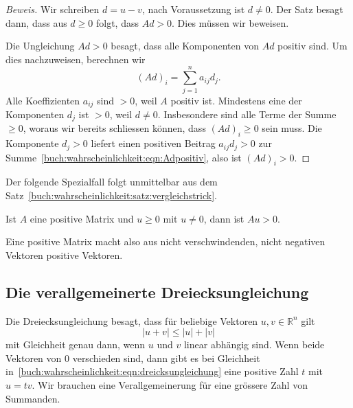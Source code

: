 \begin{proof}[Beweis]
Wir schreiben $d=u-v$, nach Voraussetzung ist $d\ne 0$.
Der Satz besagt dann, dass aus $d\ge 0$ folgt, dass $Ad>0$.
Dies müssen wir beweisen.

Die Ungleichung $Ad>0$ besagt, dass alle Komponenten von $Ad$ 
positiv sind.
Um dies nachzuweisen, berechnen wir
\begin{equation}
(Ad)_i
=
\sum_{j=1}^n
a_{i\!j}
d_j.
\label{buch:wahrscheinlichkeit:eqn:Adpositiv}
\end{equation}
Alle Koeffizienten  $a_{i\!j}$ sind $>0$, weil $A$ positiv ist.
Mindestens eine der Komponenten $d_j$ ist $>0$, weil $d\ne 0$.
Insbesondere sind alle Terme der Summe $\ge 0$, woraus wir
bereits schliessen können, dass $(Ad)_i\ge 0$ sein muss.
Die Komponente $d_j>0$ liefert einen positiven Beitrag
$a_{i\!j}d_j>0$
zur Summe~\eqref{buch:wahrscheinlichkeit:eqn:Adpositiv},
also ist $(Ad)_i>0$.
\end{proof}

Der folgende Spezialfall folgt unmittelbar aus dem
Satz~\ref{buch:wahrscheinlichkeit:satz:vergleichstrick}.

\begin{korollar}
\label{buch:wahrscheinlichkeit:satz:Au>0korollar}
Ist $A$ eine positive Matrix und $u\ge 0$ mit $u\ne 0$, dann
ist $Au>0$.
\end{korollar}

Eine positive Matrix macht also aus nicht verschwindenden,
nicht negativen Vektoren positive Vektoren.

%
%
\subsection{Die verallgemeinerte Dreiecksungleichung
\label{buch:subsection:verallgemeinerte-dreiecksungleichung}}
Die Dreiecksungleichung besagt, dass für beliebige Vektoren
$u,v\in\mathbb{R}^n$ gilt
\begin{equation}
|u+v|\le |u|+|v|
\label{buch:wahrscheinlichkeit:eqn:dreicksungleichung}
\end{equation}
mit Gleichheit genau dann, wenn $u$ und $v$ linear abhängig sind.
Wenn beide Vektoren von $0$ verschieden sind, dann gibt es bei Gleichheit
in~\eqref{buch:wahrscheinlichkeit:eqn:dreicksungleichung}
eine positive Zahl $t$ mit $u=tv$.
Wir brauchen eine Verallgemeinerung für eine grössere Zahl von
Summanden.


